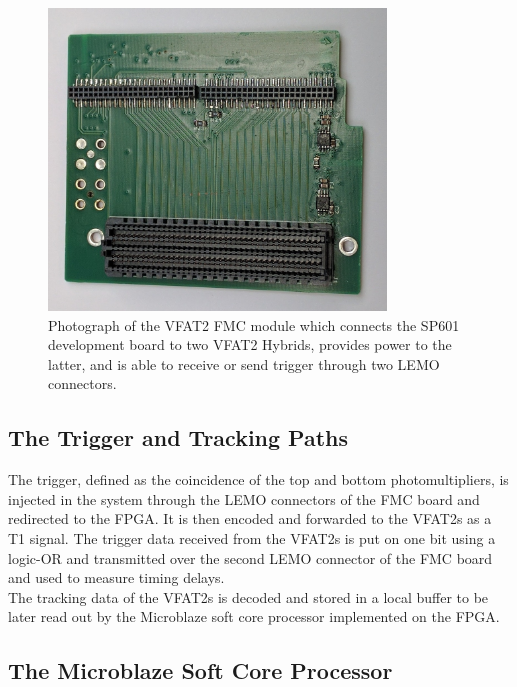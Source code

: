       \begin{figure}[h!]
        \centering
        \includegraphics[width=0.8\textwidth]{img/III-1-arch/fmc.jpg}
        \caption{Photograph of the VFAT2 FMC module which connects the SP601 development board to two VFAT2 Hybrids, provides power to the latter, and is able to receive or send trigger through two LEMO connectors.}
        \label{fig:III-1-fmc}
      \end{figure}

    \subsection{The Trigger and Tracking Paths}

      The trigger, defined as the coincidence of the top and bottom photomultipliers, is injected in the system through the LEMO connectors of the FMC board and redirected to the FPGA. It is then encoded and forwarded to the VFAT2s as a T1 signal. The trigger data received from the VFAT2s is put on one bit using a logic-OR and transmitted over the second LEMO connector of the FMC board and used to measure timing delays. \\

      The tracking data of the VFAT2s is decoded and stored in a local buffer to be later read out by the Microblaze soft core processor implemented on the FPGA.

    \subsection{The Microblaze Soft Core Processor}

